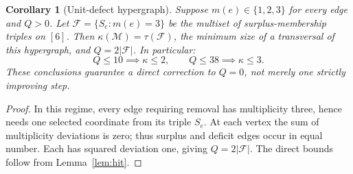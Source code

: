 \documentclass[11pt]{article}
\newtheorem{corollary}[theorem]{Corollary}
\begin{document}
\begin{corollary}[Unit-defect hypergraph]\label{cor:unit}
Suppose $m(e)\in\{1,2,3\}$ for every edge and $Q>0$. Let
$\mathcal F=\{S_e:m(e)=3\}$ be the multiset of surplus-membership
triples on $[6]$. Then $\kappa(\mathcal M)=\tau(\mathcal F)$,
the minimum size of a transversal of this hypergraph, and
$Q=2|\mathcal F|$. In particular:
\[
 Q\le10\implies\kappa\le2,\qquad
 Q\le38\implies\kappa\le3.
\]
These conclusions guarantee a \emph{direct correction to $Q=0$},
not merely one strictly improving step.
\end{corollary}
\begin{proof}
In this regime, every edge requiring removal has multiplicity
three, hence needs one selected coordinate from its triple $S_e$.
At each vertex the sum of multiplicity deviations is zero;
thus surplus and deficit edges occur in equal number. Each has
squared deviation one, giving $Q=2|\mathcal F|$. The direct
bounds follow from Lemma~\ref{lem:hit}.
\end{proof}
\end{document}
